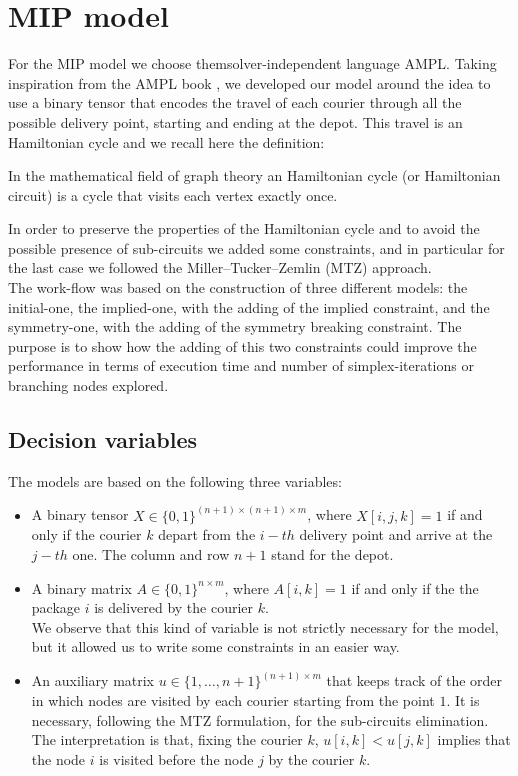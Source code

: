 \section{MIP model}
For the MIP model we choose themsolver-independent language AMPL. Taking inspiration from the AMPL book \cite{AMPL_book}, we developed our model around the idea to use a binary tensor that encodes the travel of each courier through all the possible delivery point, starting and ending at the depot. This travel is an Hamiltonian cycle and we recall here the definition:
\begin{definition}
In the mathematical field of graph theory an Hamiltonian cycle (or Hamiltonian circuit) is a cycle that visits each vertex exactly once.
\end{definition}
In order to preserve the properties of the Hamiltonian cycle and to avoid the possible presence of sub-circuits we added some constraints, and in particular for the last case we followed the Miller–Tucker–Zemlin (MTZ) approach.\\
The work-flow was based on the construction of three different models: the initial-one, the implied-one, with the adding of the implied constraint, and the symmetry-one, with the adding of the symmetry breaking constraint. The purpose is to show how the adding of this two constraints could improve the performance in terms of execution time and number of simplex-iterations or branching nodes explored.

\subsection{Decision variables}
The models are based on the following three variables:
\begin{itemize}
    \item A binary tensor $X \in \{0,1\}^{(n+1) \times (n+1) \times m}$, where $X[i,j,k] = 1$ if and only if the courier $k$ depart from the $i-th$ delivery point and arrive at the $j-th$ one. The column and row $n+1$ stand for the depot. 
    \item A binary matrix $A \in \{0,1\}^{n \times m}$, where $A[i,k] = 1$ if and only if the the package $i$ is delivered by the courier $k$.\\
    We observe that this kind of variable is not strictly necessary for the model, but it allowed us to write some constraints in an easier way.
    \item An auxiliary matrix $u \in \{1,\dots,n+1\}^{(n+1) \times m}$ that keeps track of the order in which nodes are visited by each courier starting from the point $1$. It is necessary, following the MTZ formulation, for the sub-circuits elimination. The interpretation is that, fixing the courier $k$, $u[i,k] < u[j,k]$ implies that the node $i$ is visited before the node $j$ by the courier $k$.
\end{itemize}



